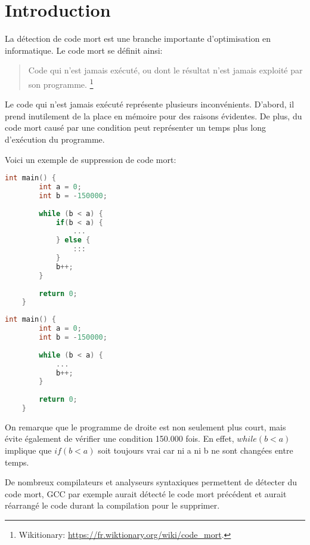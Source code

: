 \section{Introduction}
La détection de code mort est une branche importante d'optimisation en informatique. Le code mort se définit ainsi:
\begin{quotation}
    Code qui n'est jamais exécuté, ou dont le résultat n'est jamais exploité par son programme.
    \footnote{Wikitionary: \url{https://fr.wiktionary.org/wiki/code_mort}.}
\end{quotation}
Le code qui n'est jamais exécuté représente plusieurs inconvénients. D'abord, il prend inutilement de la place en mémoire pour des raisons évidentes. De plus, du code mort causé par une condition peut représenter un temps plus long d'exécution du programme.

Voici un exemple de suppression de code mort:
\begin{multicols}{2}
\begin{lstlisting}[language=c]
    int main() {
        int a = 0;
        int b = -150000;
        
        while (b < a) {
            if(b < a) {
                ...
            } else {
                :::
            }
            b++;
        }
    
        return 0;
    }
\end{lstlisting}
\columnbreak
\begin{lstlisting}[language=c]
    int main() {
        int a = 0;
        int b = -150000;
        
        while (b < a) {
            ...
            b++;
        }
    
        return 0;
    }
\end{lstlisting}
\end{multicols}
\begin{center}
\end{center}

On remarque que le programme de droite est non seulement plus court, mais évite également de vérifier une condition 150.000 fois. En effet, $while (b < a)$ implique que $if (b < a)$ soit toujours vrai car ni a ni b ne sont changées entre temps. 

De nombreux compilateurs et analyseurs syntaxiques permettent de détecter du code mort, GCC par exemple aurait détecté le code mort précédent et aurait réarrangé le code durant la compilation pour le supprimer.

